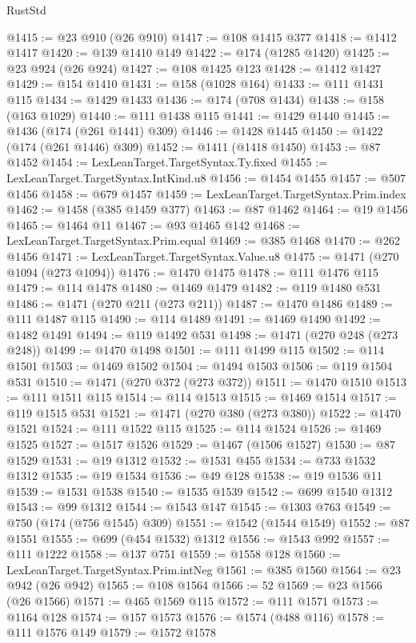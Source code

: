 \begin{lexlean}{RustStd}
\begin{coremodule}
@1415 := @23 @910 (@26 @910)
@1417 := @108 @1415 @377
@1418 := @1412 @1417
@1420 := @139 @1410 @149
@1422 := @174 (@1285 @1420)
@1425 := @23 @924 (@26 @924)
@1427 := @108 @1425 @123
@1428 := @1412 @1427
@1429 := @154 @1410
@1431 := @158 (@1028 @164)
@1433 := @111 @1431 @115
@1434 := @1429 @1433
@1436 := @174 (@708 @1434)
@1438 := @158 (@163 @1029)
@1440 := @111 @1438 @115
@1441 := @1429 @1440
@1445 := @1436 (@174 (@261 @1441) @309)
@1446 := @1428 @1445
@1450 := @1422 (@174 (@261 @1446) @309)
@1452 := @1411 (@1418 @1450)
@1453 := @87 @1452
@1454 := LexLeanTarget.TargetSyntax.Ty.fixed
@1455 := LexLeanTarget.TargetSyntax.IntKind.u8
@1456 := @1454 @1455
@1457 := @507 @1456
@1458 := @679 @1457
@1459 := LexLeanTarget.TargetSyntax.Prim.index
@1462 := @1458 (@385 @1459 @377)
@1463 := @87 @1462
@1464 := @19 @1456
@1465 := @1464 @11
@1467 := @93 @1465 @142
@1468 := LexLeanTarget.TargetSyntax.Prim.equal
@1469 := @385 @1468
@1470 := @262 @1456
@1471 := LexLeanTarget.TargetSyntax.Value.u8
@1475 := @1471 (@270 @1094 (@273 @1094))
@1476 := @1470 @1475
@1478 := @111 @1476 @115
@1479 := @114 @1478
@1480 := @1469 @1479
@1482 := @119 @1480 @531
@1486 := @1471 (@270 @211 (@273 @211))
@1487 := @1470 @1486
@1489 := @111 @1487 @115
@1490 := @114 @1489
@1491 := @1469 @1490
@1492 := @1482 @1491
@1494 := @119 @1492 @531
@1498 := @1471 (@270 @248 (@273 @248))
@1499 := @1470 @1498
@1501 := @111 @1499 @115
@1502 := @114 @1501
@1503 := @1469 @1502
@1504 := @1494 @1503
@1506 := @119 @1504 @531
@1510 := @1471 (@270 @372 (@273 @372))
@1511 := @1470 @1510
@1513 := @111 @1511 @115
@1514 := @114 @1513
@1515 := @1469 @1514
@1517 := @119 @1515 @531
@1521 := @1471 (@270 @380 (@273 @380))
@1522 := @1470 @1521
@1524 := @111 @1522 @115
@1525 := @114 @1524
@1526 := @1469 @1525
@1527 := @1517 @1526
@1529 := @1467 (@1506 @1527)
@1530 := @87 @1529
@1531 := @19 @1312
@1532 := @1531 @455
@1534 := @733 @1532 @1312
@1535 := @19 @1534
@1536 := @49 @128
@1538 := @19 @1536 @11
@1539 := @1531 @1538
@1540 := @1535 @1539
@1542 := @699 @1540 @1312
@1543 := @99 @1312
@1544 := @1543 @147
@1545 := @1303 @763
@1549 := @750 (@174 (@756 @1545) @309)
@1551 := @1542 (@1544 @1549)
@1552 := @87 @1551
@1555 := @699 (@454 @1532) @1312
@1556 := @1543 @992
@1557 := @111 @1222
@1558 := @137 @751
@1559 := @1558 @128
@1560 := LexLeanTarget.TargetSyntax.Prim.intNeg
@1561 := @385 @1560
@1564 := @23 @942 (@26 @942)
@1565 := @108 @1564
@1566 := 52
@1569 := @23 @1566 (@26 @1566)
@1571 := @465 @1569 @115
@1572 := @111 @1571
@1573 := @1164 @128
@1574 := @157 @1573
@1576 := @1574 (@488 @116)
@1578 := @111 @1576 @149
@1579 := @1572 @1578

\end{coremodule}
\end{lexlean}
